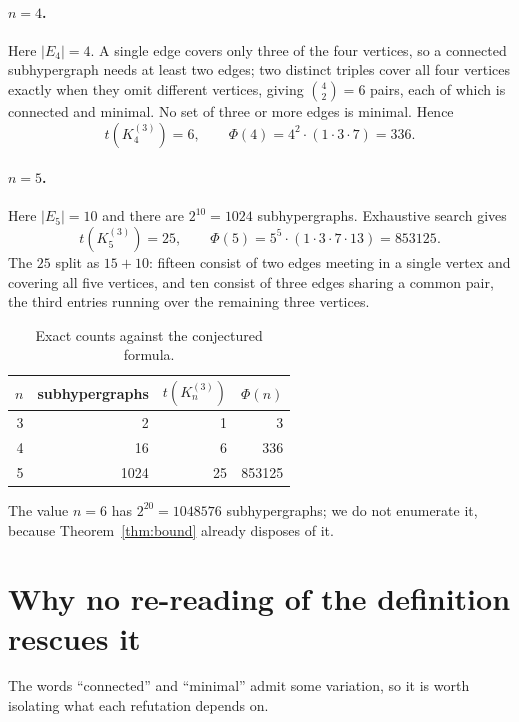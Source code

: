 \documentclass[11pt]{article}
\theoremstyle{remark}
\begin{document}
\paragraph{$n = 4$.} Here $|E_4| = 4$. A single edge covers only three of the
four vertices, so a connected subhypergraph needs at least two edges; two
distinct triples cover all four vertices exactly when they omit different
vertices, giving $\binom{4}{2} = 6$ pairs, each of which is connected and
minimal. No set of three or more edges is minimal. Hence
\[
  t(K_4^{(3)}) = 6, \qquad \Phi(4) = 4^2 \cdot (1\cdot 3\cdot 7) = 336.
\]

\paragraph{$n = 5$.} Here $|E_5| = 10$ and there are $2^{10} = 1024$
subhypergraphs. Exhaustive search gives
\[
  t(K_5^{(3)}) = 25, \qquad
  \Phi(5) = 5^5 \cdot (1\cdot 3\cdot 7\cdot 13) = 853125.
\]
The $25$ split as $15 + 10$: fifteen consist of two edges meeting in a single
vertex and covering all five vertices, and ten consist of three edges sharing a
common pair, the third entries running over the remaining three vertices.

\begin{table}[h]
\centering
\begin{tabular}{rrrr}
\toprule
$n$ & subhypergraphs & $t(K_n^{(3)})$ & $\Phi(n)$ \\
\midrule
3 & 2    & 1  & 3       \\
4 & 16   & 6  & 336     \\
5 & 1024 & 25 & 853125  \\
\bottomrule
\end{tabular}
\caption{Exact counts against the conjectured formula.}
\label{tab:exact}
\end{table}

The value $n=6$ has $2^{20} = 1048576$ subhypergraphs; we do not enumerate it,
because Theorem~\ref{thm:bound} already disposes of it.

\section{Why no re-reading of the definition rescues it}

The words ``connected'' and ``minimal'' admit some variation, so it is worth
isolating what each refutation depends on.
\end{document}

